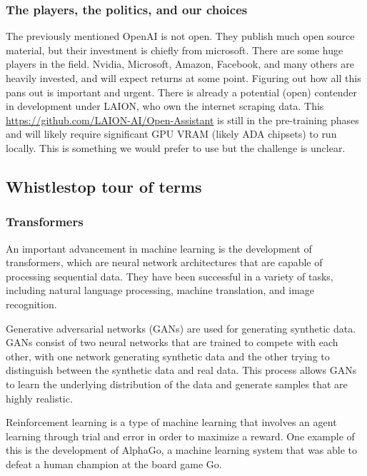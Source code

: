 \subsubsection{The players, the politics, and our choices}
The previously mentioned OpenAI is not open. They publish much open source material, but their investment is chiefly from microsoft. There are some huge players in the field. Nvidia, Microsoft, Amazon, Facebook, and many others are heavily invested, and will expect returns at some point. Figuring out how all this pans out is important and urgent. There is already a potential (open) contender in development under LAION, who own the internet scraping data. This \href{'Open-Assistant'}{https://github.com/LAION-AI/Open-Assistant} is still in the pre-training phases and will likely require significant GPU VRAM (likely ADA chipsets) to run locally. This is something we would prefer to use but the challenge is unclear.
\subsection{Whistlestop tour of terms}
\subsubsection{Transformers}
An important advancement in machine learning is the development of transformers, which are neural network architectures that are capable of processing sequential data. They have been successful in a variety of tasks, including natural language processing, machine translation, and image recognition. \par
Generative adversarial networks (GANs) are used for generating synthetic data. GANs consist of two neural networks that are trained to compete with each other, with one network generating synthetic data and the other trying to distinguish between the synthetic data and real data. This process allows GANs to learn the underlying distribution of the data and generate samples that are highly realistic.\par
Reinforcement learning is a type of machine learning that involves an agent learning through trial and error in order to maximize a reward. One example of this is the development of AlphaGo, a machine learning system that was able to defeat a human champion at the board game Go.\par

